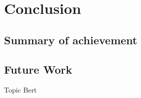 \chapter{Conclusion}
\listoftodos
\section{Summary of achievement}
\section{Future Work}

Topic Bert 